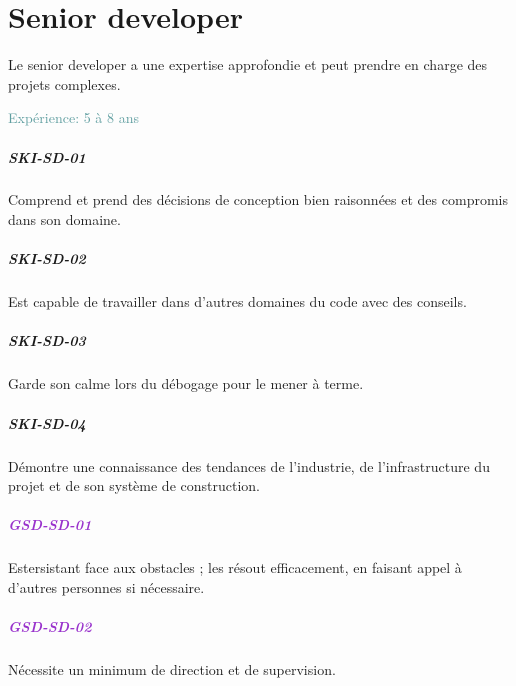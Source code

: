 \documentclass[a4paper, french, openany, 12pt]{book}
\newcommand\dex[1]{\textcolor{BrickRed}{\textbf{\uppercase{ski-{#1}}}}}
\newcommand\str[1]{\textcolor{DarkOrchid}{\textbf{\uppercase{gsd-{#1}}}}}
\newcommand\xp[1]{\textcolor{CadetBlue}{Expérience: {#1} ans}}
\begin{document}
\chapter{Senior developer}

Le senior developer a une expertise approfondie et peut prendre en charge des projets complexes.

\xp{5 à 8}

\begin{multicols}{2}

  \paragraph*{\dex{sd-01}}

  Comprend et prend des décisions de conception bien raisonnées et des compromis dans son domaine.

  \paragraph*{\dex{sd-02}}

  Est capable de travailler dans d'autres domaines du code avec des conseils.

  \paragraph*{\dex{sd-03}}

  Garde son calme lors du débogage pour le mener à terme.

  \paragraph*{\dex{sd-04}}

  Démontre une connaissance des tendances de l'industrie, de l'infrastructure du projet et de son système de 
  construction.

  \paragraph*{\str{sd-01}}

  Estersistant face aux obstacles ; les résout efficacement, en faisant appel à d'autres personnes si nécessaire. 

  \paragraph*{\str{sd-02}}

  Nécessite un minimum de direction et de supervision.


\end{multicols}
\end{document}
